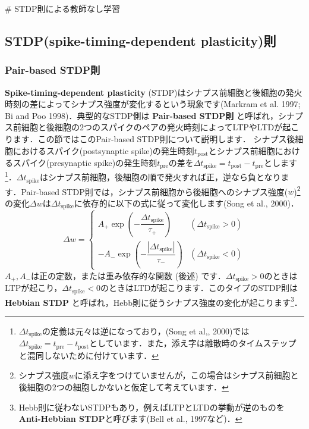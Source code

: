 # STDP則による教師なし学習
\subsection{STDP(spike-timing-dependent plasticity)則}
\subsubsection{Pair-based STDP則}
\textbf{Spike-timing-dependent plasticity} (STDP)はシナプス前細胞と後細胞の発火時刻の差によってシナプス強度が変化するという現象です(Markram et al. 1997; Bi and Poo 1998)．典型的なSTDP側は \textbf{Pair-based STDP則} と呼ばれ，シナプス前細胞と後細胞の2つのスパイクのペアの発火時刻によってLTPやLTDが起こります．この節ではこのPair-based STDP則について説明します．
シナプス後細胞におけるスパイク(postsynaptic spike)の発生時刻$t_\text{post}$とシナプス前細胞におけるスパイク(presynaptic spike)の発生時刻$t_\text{pre}$の差を$\Delta t_{\text{spike}}=t_\text{post}-t_\text{pre}$とします\footnote{$\Delta t_{\text{spike}}$の定義は元々は逆になっており，(Song et al,, 2000)では$\Delta t_{\text{spike}}=t_\text{pre}-t_\text{post}$としています．また，添え字は離散時のタイムステップと混同しないために付けています．}．$\Delta t_{\text{spike}}$はシナプス前細胞，後細胞の順で発火すれば正，逆なら負となります．Pair-based STDP則では，シナプス前細胞から後細胞へのシナプス強度($w$)\footnote{シナプス強度$w$に添え字をつけていませんが，この場合はシナプス前細胞と後細胞の2つの細胞しかないと仮定して考えています．}の変化$\Delta w$は$\Delta t_{\text{spike}}$に依存的に以下の式に従って変化します(Song et al., 2000)．
\begin{equation}
\Delta w = \begin{cases}
A_{+} \exp\left(-\dfrac{\Delta t_{\text{spike}}}{\tau_{+}}\right) &(\Delta t_{\text{spike}}> 0) \\
-A_{-} \exp\left(-\dfrac{|\Delta t_{\text{spike}}|}{\tau_{-}}\right) &(\Delta t_{\text{spike}}< 0)
\end{cases}
\end{equation}
$A_+, A_-$は正の定数，または重み依存的な関数 (後述) です．$\Delta t_{\text{spike}}>0$のときはLTPが起こり，$\Delta t_{\text{spike}}<0$のときはLTDが起こります．このタイプのSTDP則は\textbf{Hebbian STDP} と呼ばれ，Hebb則に従うシナプス強度の変化が起こります\footnote{Hebb則に従わないSTDPもあり，例えばLTPとLTDの挙動が逆のものを\textbf{Anti-Hebbian STDP}と呼びます(Bell et al., 1997など)．}．
